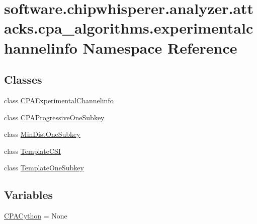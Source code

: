 \hypertarget{namespacesoftware_1_1chipwhisperer_1_1analyzer_1_1attacks_1_1cpa__algorithms_1_1experimentalchannelinfo}{}\section{software.\+chipwhisperer.\+analyzer.\+attacks.\+cpa\+\_\+algorithms.\+experimentalchannelinfo Namespace Reference}
\label{namespacesoftware_1_1chipwhisperer_1_1analyzer_1_1attacks_1_1cpa__algorithms_1_1experimentalchannelinfo}
\subsection*{Classes}
\begin{DoxyCompactItemize}
\item 
class \hyperlink{classsoftware_1_1chipwhisperer_1_1analyzer_1_1attacks_1_1cpa__algorithms_1_1experimentalchannelif6c161da2587ecb2ba5aefd93c43622a}{C\+P\+A\+Experimental\+Channelinfo}
\item 
class \hyperlink{classsoftware_1_1chipwhisperer_1_1analyzer_1_1attacks_1_1cpa__algorithms_1_1experimentalchannelinfo_1_1CPAProgressiveOneSubkey}{C\+P\+A\+Progressive\+One\+Subkey}
\item 
class \hyperlink{classsoftware_1_1chipwhisperer_1_1analyzer_1_1attacks_1_1cpa__algorithms_1_1experimentalchannelinfo_1_1MinDistOneSubkey}{Min\+Dist\+One\+Subkey}
\item 
class \hyperlink{classsoftware_1_1chipwhisperer_1_1analyzer_1_1attacks_1_1cpa__algorithms_1_1experimentalchannelinfo_1_1TemplateCSI}{Template\+C\+S\+I}
\item 
class \hyperlink{classsoftware_1_1chipwhisperer_1_1analyzer_1_1attacks_1_1cpa__algorithms_1_1experimentalchannelinfo_1_1TemplateOneSubkey}{Template\+One\+Subkey}
\end{DoxyCompactItemize}
\subsection*{Variables}
\begin{DoxyCompactItemize}
\item 
\hyperlink{namespacesoftware_1_1chipwhisperer_1_1analyzer_1_1attacks_1_1cpa__algorithms_1_1experimentalchannelinfo_ab740da5830799dd3e218a523b50cb99e}{C\+P\+A\+Cython} = None
\end{DoxyCompactItemize}


